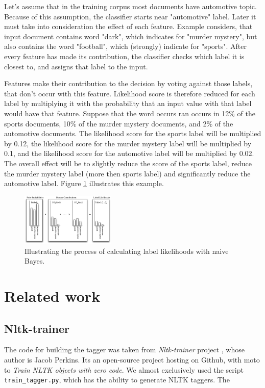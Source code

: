 \documentclass[10pt, conference, compsocconf]{IEEEtran}
\begin{document}
Let's assume that in the training corpus most documents have automotive topic. Because of this assumption, the classifier starts near "automotive" label. Later it must take into consideration the effect of each feature. Example considers, that input document contains word "dark", which indicates for "murder mystery", but also contains the word "football", which (strongly) indicate for "sports". After every feature has made its contribution, the classifier checks which label it is closest to, and assigns that label to the input.

Features make their contribution to the  decision by voting against those labels, that don't occur with this feature. Likelihood score is therefore reduced for each label by multiplying it with the probability that an input value with that label would have that feature. Suppose that the word occurs ran occurs in  12\% of the sports documents, 10\% of the murder mystery documents, and 2\% of the automotive documents. The likelihood score for the sports label will be multiplied by 0.12, the likelihood score for the murder mystery label will be multiplied by 0.1, and the likelihood score for the automotive label will be multiplied by 0.02. The overall effect will be to slightly reduce the score of the sports label, reduce the murder mystery label (more then sports label) and significantly reduce the automotive label. Figure \ref{fig:naive-bayes-bargraph} illustrates this example.

\begin{figure}[htb]
\begin{center}
\includegraphics[width=0.4\textwidth]{naive_bayes_bargraph.png} 
\end{center}
\caption{Illustrating the process of calculating label likelihoods with naive Bayes.}
\label{fig:naive-bayes-bargraph}
\end{figure}

\section{Related work}
\subsection{Nltk-trainer} %
The code for building the tagger was taken from \textit{Nltk-trainer}  project \cite{nltk-trainer}, whose author is Jacob Perkins.
Its an open-source project hosting on Github, with moto to \textit{Train NLTK objects with zero code}.
We almost exclusively used the script \texttt{train\_tagger.py}, which has the ability to generate NLTK taggers. The 
\end{document}
